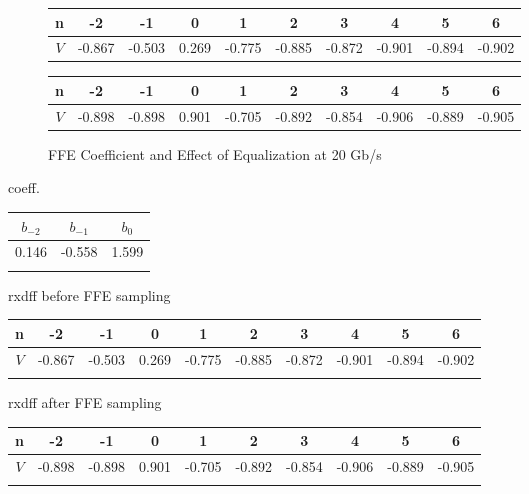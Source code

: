 \documentclass{book}  %
\begin{document}
\begin{paper}
\begin{figure}
	\begin{minipage}[tb]{\textwidth}
		\centering	
		\begin{tabular}{|c|c|c|c|c|c|c|c|c|c|}\hline
			n  &   -2   &   -1   &   0   &    1   &    2   &    3   &    4   &    5   &    6   \\ \hline 
			$V$ & -0.867 & -0.503 & 0.269 & -0.775 & -0.885 & -0.872 & -0.901 & -0.894 & -0.902 \\ \hline 
		\end{tabular}
		\label{table:20G_rxdiff_sample_wo_FFE}
	\end{minipage}	
	\begin{minipage}[tb]{\textwidth}
		\centering	
		\begin{tabular}{|c|c|c|c|c|c|c|c|c|c|}\hline
			n  &   -2   &   -1   &   0   &    1   &    2   &    3   &    4   &    5   &    6   \\ \hline 
			$V$ & -0.898 & -0.898 & 0.901 & -0.705 & -0.892 & -0.854 & -0.906 & -0.889 & -0.905 \\ \hline 
		\end{tabular}
		\label{table:20G_rxdiff_sample_w__FFE} 
	\end{minipage}
	\caption{FFE Coefficient and Effect of Equalization at 20 Gb/s}
\end{figure}







coeff.
\begin{tabular}{|c|c|c|}\hline
	$b_{-2}$ & $b_{-1}$ &  $b_{0}$ \\ \hline 
	0.146 &   -0.558 &    1.599 \\ \hline
	\label{table:20G_FFE_coeff} 
\end{tabular}

rxdff before FFE sampling
\begin{tabular}{|c|c|c|c|c|c|c|c|c|c|}\hline
	n  &   -2   &   -1   &   0   &    1   &    2   &    3   &    4   &    5   &    6   \\ \hline 
	$V$ & -0.867 & -0.503 & 0.269 & -0.775 & -0.885 & -0.872 & -0.901 & -0.894 & -0.902 \\ \hline 
	\label{table:20G_rxdiff_sample_wo_FFE}
\end{tabular}

rxdff after FFE sampling
\begin{tabular}{|c|c|c|c|c|c|c|c|c|c|}\hline
	n  &   -2   &   -1   &   0   &    1   &    2   &    3   &    4   &    5   &    6   \\ \hline 
	$V$ & -0.898 & -0.898 & 0.901 & -0.705 & -0.892 & -0.854 & -0.906 & -0.889 & -0.905 \\ \hline 
	\label{table:20G_rxdiff_sample_w__FFE}
\end{tabular}


\end{paper}
\end{document}
